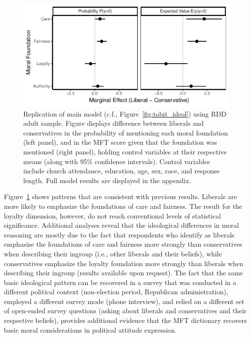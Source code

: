 \documentclass[12pt]{article}
\begin{document}
\begin{figure}[ht]\centering
\includegraphics{../calc/fig/tobit_ideol_lisurvey.pdf}
\caption{Replication of main model (c.f., Figure~\ref{fig:tobit_ideol}) using RDD adult sample. Figure displays difference between liberals and conservatives in the probability of mentioning each moral foundation (left panel), and in the MFT score given that the foundation was mentioned (right panel), holding control variables at their respective means (along with 95\% confidence intervals). Control variables include church attendance, education, age, sex, race, and response length. Full model results are displayed in the appendix.
}\label{fig:tobit_ideol_lisurvey}
\end{figure}

Figure~\ref{fig:tobit_ideol_lisurvey} shows patterns that are consistent with previous results. Liberals are more likely to emphasize the foundations of care and fairness. The result for the loyalty dimension, however, do not reach conventional levels of statistical significance. Additional analyses reveal that the ideological differences in moral reasoning are mostly due to the fact that respondents who identify as liberals emphasize the foundations of care and fairness more strongly than conservatives when describing their ingroup (i.e., other liberals and their beliefs), while conservatives emphasize the loyalty foundation more strongly than liberals when describing their ingroup (results available upon request). The fact that the same basic ideological pattern can be recovered in a survey that was conducted in a different political context (non-election period, Republican administration), employed a different survey mode (phone interview), and relied on a different set of open-ended survey questions (asking about liberals and conservatives and their respective beliefs), provides additional evidence that the MFT dictionary recovers basic moral considerations in political attitude expression.
\end{document}
